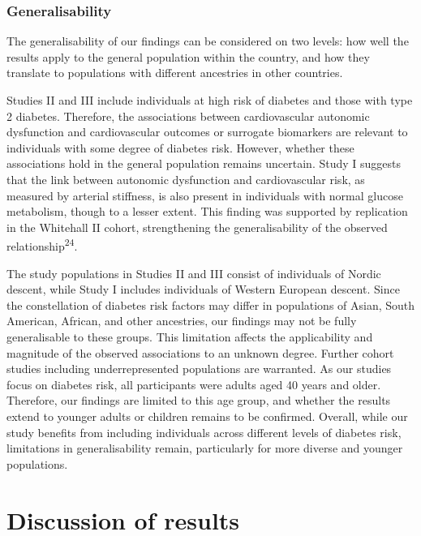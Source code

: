\documentclass[
  a4paper,
  headsepline=true,
  open=any]{scrbook}
\begin{document}
\hypertarget{generalisability}{%
\subsubsection{Generalisability}\label{generalisability}}

The generalisability of our findings can be considered on two levels:
how well the results apply to the general population within the country,
and how they translate to populations with different ancestries in other
countries.

Studies II and III include individuals at high risk of diabetes and
those with type 2 diabetes. Therefore, the associations between
cardiovascular autonomic dysfunction and cardiovascular outcomes or
surrogate biomarkers are relevant to individuals with some degree of
diabetes risk. However, whether these associations hold in the general
population remains uncertain. Study I suggests that the link between
autonomic dysfunction and cardiovascular risk, as measured by arterial
stiffness, is also present in individuals with normal glucose
metabolism, though to a lesser extent. This finding was supported by
replication in the Whitehall II cohort, strengthening the
generalisability of the observed relationship\textsuperscript{24}.

The study populations in Studies II and III consist of individuals of
Nordic descent, while Study I includes individuals of Western European
descent. Since the constellation of diabetes risk factors may differ in
populations of Asian, South American, African, and other ancestries, our
findings may not be fully generalisable to these groups. This limitation
affects the applicability and magnitude of the observed associations to
an unknown degree. Further cohort studies including underrepresented
populations are warranted. As our studies focus on diabetes risk, all
participants were adults aged 40 years and older. Therefore, our
findings are limited to this age group, and whether the results extend
to younger adults or children remains to be confirmed. Overall, while
our study benefits from including individuals across different levels of
diabetes risk, limitations in generalisability remain, particularly for
more diverse and younger populations.

\hypertarget{discussion-of-results}{%
\section{Discussion of results}\label{discussion-of-results}}
\end{document}
